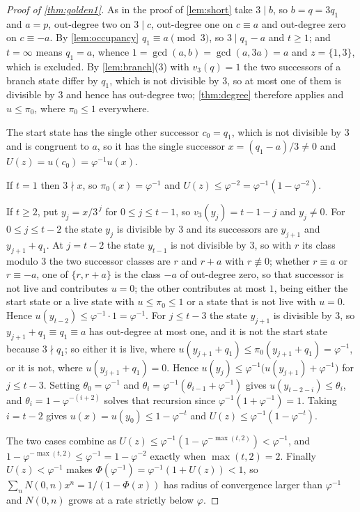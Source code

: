 \documentclass[11pt]{amsart}
\theoremstyle{definition}
\theoremstyle{remark}
\begin{document}
\begin{proof}[Proof of \cref{thm:golden1}]
As in the proof of \cref{lem:short} take $3\mid b$, so $b=q=3q_1$ and $a=p$, out-degree two on $3\mid c$, out-degree one on $c\equiv a$ and out-degree zero on $c\equiv-a$. By \cref{lem:occupancy} $q_1\equiv a\pmod 3$, so $3\mid q_1-a$ and $t\ge 1$; and $t=\infty$ means $q_1=a$, whence $1=\gcd(a,b)=\gcd(a,3a)=a$ and $z=\{1,3\}$, which is excluded. By \cref{lem:branch}(3) with $v_3(q)=1$ the two successors of a branch state differ by $q_1$, which is not divisible by $3$, so at most one of them is divisible by $3$ and hence has out-degree two; \cref{thm:degree} therefore applies and $u\le\pi_0$, where $\pi_0\le 1$ everywhere.

The start state has the single other successor $c_0=q_1$, which is not divisible by $3$ and is congruent to $a$, so it has the single successor $x=(q_1-a)/3\neq 0$ and $U(z)=u(c_0)=\varphi^{-1}u(x)$.

If $t=1$ then $3\nmid x$, so $\pi_0(x)=\varphi^{-1}$ and $U(z)\le\varphi^{-2}=\varphi^{-1}(1-\varphi^{-2})$.

If $t\ge 2$, put $y_j=x/3^{\,j}$ for $0\le j\le t-1$, so $v_3(y_j)=t-1-j$ and $y_j\neq 0$. For $0\le j\le t-2$ the state $y_j$ is divisible by $3$ and its successors are $y_{j+1}$ and $y_{j+1}+q_1$. At $j=t-2$ the state $y_{t-1}$ is not divisible by $3$, so with $r$ its class modulo $3$ the two successor classes are $r$ and $r+a$ with $r\not\equiv 0$; whether $r\equiv a$ or $r\equiv-a$, one of $\{r,r+a\}$ is the class $-a$ of out-degree zero, so that successor is not live and contributes $u=0$; the other contributes at most $1$, being either the start state or a live state with $u\le\pi_0\le 1$ or a state that is not live with $u=0$. Hence $u(y_{t-2})\le\varphi^{-1}\cdot 1=\varphi^{-1}$. For $j\le t-3$ the state $y_{j+1}$ is divisible by $3$, so $y_{j+1}+q_1\equiv q_1\equiv a$ has out-degree at most one, and it is not the start state because $3\nmid q_1$; so either it is live, where $u(y_{j+1}+q_1)\le\pi_0(y_{j+1}+q_1)=\varphi^{-1}$, or it is not, where $u(y_{j+1}+q_1)=0$. Hence $u(y_j)\le\varphi^{-1}\bigl(u(y_{j+1})+\varphi^{-1}\bigr)$ for $j\le t-3$. Setting $\theta_0=\varphi^{-1}$ and $\theta_{i}=\varphi^{-1}(\theta_{i-1}+\varphi^{-1})$ gives $u(y_{t-2-i})\le\theta_i$, and $\theta_i=1-\varphi^{-(i+2)}$ solves that recursion since $\varphi^{-1}(1+\varphi^{-1})=1$. Taking $i=t-2$ gives $u(x)=u(y_0)\le 1-\varphi^{-t}$ and $U(z)\le\varphi^{-1}(1-\varphi^{-t})$.

The two cases combine as $U(z)\le\varphi^{-1}(1-\varphi^{-\max(t,2)})<\varphi^{-1}$, and $1-\varphi^{-\max(t,2)}\le\varphi^{-1}=1-\varphi^{-2}$ exactly when $\max(t,2)=2$. Finally $U(z)<\varphi^{-1}$ makes $\Phi(\varphi^{-1})=\varphi^{-1}(1+U(z))<1$, so $\sum_nN(0,n)x^n=1/(1-\Phi(x))$ has radius of convergence larger than $\varphi^{-1}$ and $N(0,n)$ grows at a rate strictly below $\varphi$.
\end{proof}
\end{document}
